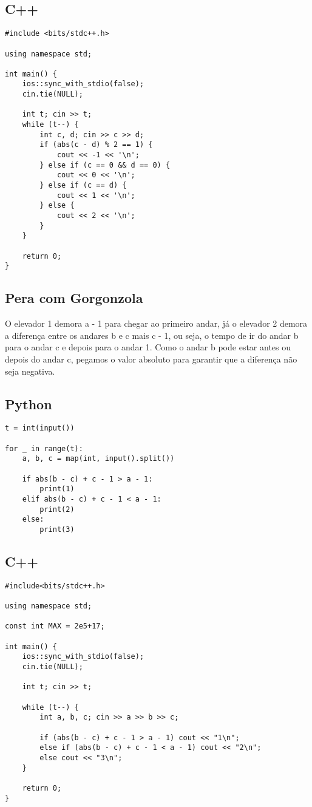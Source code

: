\documentclass[11pt,fancychapters]{article}
\begin{document}
\subsection{C++}
\begin{lstlisting}[style=c++]
#include <bits/stdc++.h>

using namespace std;
 
int main() {
    ios::sync_with_stdio(false);
    cin.tie(NULL);
    
    int t; cin >> t;
    while (t--) {
        int c, d; cin >> c >> d;
        if (abs(c - d) % 2 == 1) {
            cout << -1 << '\n';
        } else if (c == 0 && d == 0) {
            cout << 0 << '\n';
        } else if (c == d) {
            cout << 1 << '\n';
        } else {
            cout << 2 << '\n';
        }
    }
 
    return 0;
}
\end{lstlisting}
\newpage

\begin{center}\section{Pera com Gorgonzola}\end{center}
\noindent
O elevador 1 demora a - 1 para chegar ao primeiro andar, já o elevador 2 demora a diferença entre os andares b e c mais c - 1, ou seja, o tempo de ir do andar b para o andar c e depois para o andar 1. Como o andar b pode estar antes ou depois do andar c, pegamos o valor absoluto para garantir que a diferença não seja negativa. \\
\subsection{Python}
\begin{lstlisting}[style=python]
t = int(input())

for _ in range(t):
    a, b, c = map(int, input().split())
    
    if abs(b - c) + c - 1 > a - 1:
        print(1)
    elif abs(b - c) + c - 1 < a - 1:
        print(2)
    else:
        print(3)
\end{lstlisting}
\subsection{C++}
\begin{lstlisting}[style=c++]
#include<bits/stdc++.h>
 
using namespace std;
 
const int MAX = 2e5+17;
 
int main() {
    ios::sync_with_stdio(false);
    cin.tie(NULL);
 
    int t; cin >> t;
    
    while (t--) {
        int a, b, c; cin >> a >> b >> c;
        
        if (abs(b - c) + c - 1 > a - 1) cout << "1\n";
        else if (abs(b - c) + c - 1 < a - 1) cout << "2\n";
        else cout << "3\n";
    }
 
    return 0;
}
\end{lstlisting}
\newpage
\end{document}
